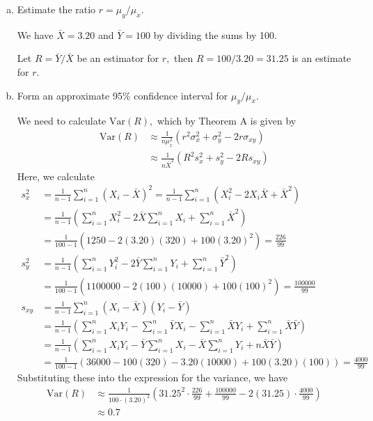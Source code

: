 \documentclass{article}
\newcommand{\var}{\mathrm{Var}}
\begin{document}
\begin{itemize}
		\begin{enumerate}[a.]
			\item Estimate the ratio $r=\mu_y/\mu_x.$
				\begin{soln}
					We have $\bar{X}=3.20$ and $\bar{Y}=100$ by dividing the sums by 100. 
					
					Let $R=\bar{Y}/\bar{X}$ be an estimator for $r,$ then $R=100/3.20=\boxed{31.25}$ is an estimate for $r.$

				\end{soln}

			\item Form an approximate 95\% confidence interval for $\mu_y/\mu_x.$ 
				\begin{soln}
					We need to calculate $\var(R),$ which by Theorem A is given by
					\begin{align*}
						\var(R) &\approx \frac{1}{n\mu_x^2}(r^2\sigma_x^2 + \sigma_y^2-2r\sigma_{xy}) \\
						&\approx \frac{1}{n\bar{X}^2}(R^2s_x^2 + s_y^2-2Rs_{xy})
					\end{align*}
					Here, we calculate
					\begin{align*}
						s_x^2 &= \frac{1}{n-1}\sum_{i=1}^{n} (X_i-\bar{X})^2 = \frac{1}{n-1} \sum_{i=1}^{n} (X_i^2-2X_i\bar{X}+\bar{X}^2) \\
						&= \frac{1}{n-1}\left( \sum_{i=1}^{n} X_i^2 - 2\bar{X}\sum_{i=1}^{n} X_i + \sum_{i=1}^{n} \bar{X}^2 \right) \\
						&= \frac{1}{100-1}\left( 1250 - 2(3.20)(320) + 100(3.20)^2 \right) = \frac{226}{99} \\
						s_y^2 &= \frac{1}{n-1} \left( \sum_{i=1}^{n} Y_i^2 - 2\bar{Y}\sum_{i=1}^{n} Y_i + \sum_{i=1}^{n} \bar{Y}^2 \right) \\
						&= \frac{1}{100-1} \left( 1100000-2(100)(10000)+100(100)^2 \right) = \frac{100000}{99} \\
						s_{xy} &= \frac{1}{n-1} \sum_{i=1}^{n}(X_i-\bar{X})(Y_i-\bar{Y}) \\
						&= \frac{1}{n-1} \left( \sum_{i=1}^{n}X_iY_i-\sum_{i=1}^{n}\bar{Y}X_i - \sum_{i=1}^{n} \bar{X}Y_i + \sum_{i=1}^{n} \bar{X}\bar{Y}\right) \\
						&= \frac{1}{n-1} \left( \sum_{i=1}^{n}X_iY_i - \bar{Y}\sum_{i=1}^{n}X_i - \bar{X}\sum_{i=1}^{n} Y_i  + n\bar{X}\bar{Y}\right) \\
						&= \frac{1}{100-1}\left( 36000-100(320)-3.20(10000)+100(	3.20)(100) \right) = \frac{4000}{99}
					\end{align*}
					Substituting these into the expression for the variance, we have
					\begin{align*}
						\var(R) &\approx \frac{1}{100\cdot(3.20)^2}\left(31.25^2\cdot \frac{226}{99} + \frac{100000}{99} - 2(31.25)\cdot\frac{4000}{99}\right) \\
						&\approx0.7
					\end{align*}


\end{soln}
\end{enumerate}
\end{itemize}
\end{document}
